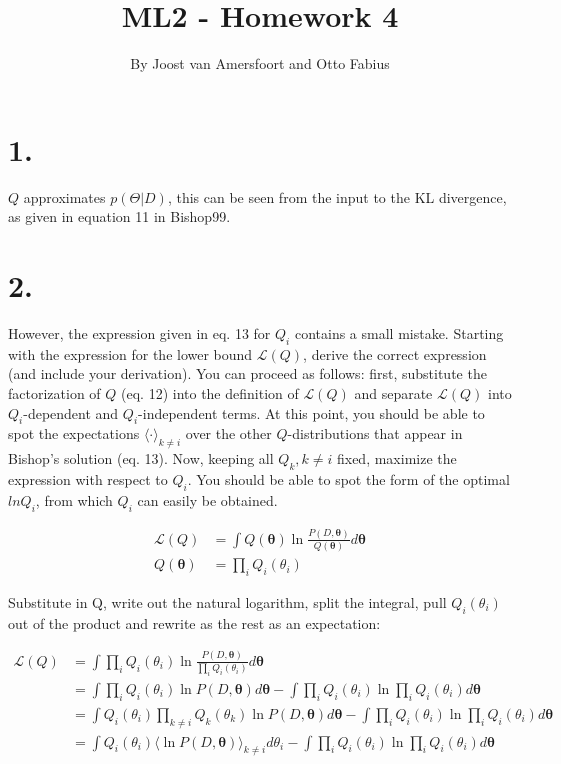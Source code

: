 \documentclass{article}
\def\*#1{\boldsymbol{#1}}
\begin{document}
\title{ML2 - Homework 4}
\author{By Joost van Amersfoort and Otto Fabius}
\maketitle

\section*{1.}

$Q$ approximates $p(\Theta|D)$, this can be seen from the input to the KL divergence, as given in equation 11 in Bishop99.

\section*{2.}

However, the expression given in eq. 13 for $Q_i$ contains a small mistake. Starting with the expression for the lower bound $\mathcal{L}(Q)$, derive the correct expression (and include your derivation). You can proceed as follows: first, substitute the factorization of $Q$ (eq. 12) into the definition of $\mathcal{L}(Q)$ and separate $\mathcal{L}(Q)$ into $Q_i$-dependent and $Q_i$-independent terms. At this point, you should be able to spot the expectations $\langle\cdot\rangle_{k \neq i}$ over the other $Q$-distributions that appear in Bishop's solution (eq. 13). Now, keeping all $Q_k, k \neq i$ fixed, maximize the expression with respect to $Q_i$. You should be able to spot the form of the optimal $ln Q_i$, from which $Q_i$ can easily be obtained.

\begin{align*}
\mathcal{L}(Q) &= \int Q(\*\theta) \ln \frac{P(D, \*\theta)}{Q(\*\theta)}d\*\theta \\
Q(\*\theta) &= \prod_i Q_i(\theta_i)
\end{align*}

Substitute in Q, write out the natural logarithm, split the integral, pull $Q_i(\theta_i)$ out of the product and rewrite as the rest as an expectation:

\begin{align*}
\mathcal{L}(Q) &= \int \prod_i Q_i(\theta_i) \ln \frac{P(D, \*\theta)}{\prod_i Q_i(\theta_i)}d\*\theta \\
&= \int \prod_i Q_i(\theta_i) \ln P(D, \*\theta)d\*\theta - \int \prod_i Q_i(\theta_i) \ln \prod_i Q_i(\theta_i)d\*\theta \\
&= \int Q_i(\theta_i) \prod_{k \neq i} Q_k(\theta_k) \ln P(D, \*\theta) d\*\theta - \int \prod_i Q_i(\theta_i) \ln \prod_i Q_i(\theta_i)d\*\theta \\
&= \int Q_i(\theta_i) \langle \ln P(D, \*\theta) \rangle_{k \neq i}  d\theta_i - \int \prod_i Q_i(\theta_i) \ln \prod_i Q_i(\theta_i)d\*\theta \\
\end{align*}
\end{document}
